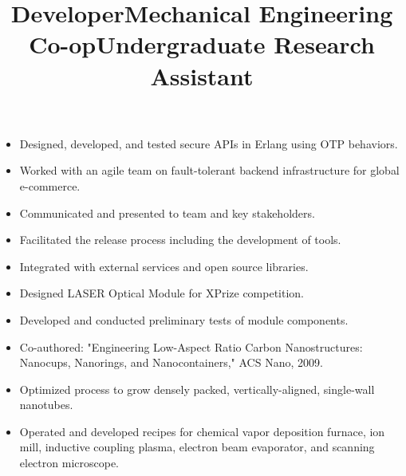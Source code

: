 \documentclass[line]{res}
\begin{document}
\begin{resume}
\title{Developer}
\begin{position}
\noindent
\vspace {-10 pt}
\begin{itemize}
\item Designed, developed, and tested secure APIs in Erlang using OTP behaviors.
\item Worked with an agile team on fault-tolerant backend infrastructure for global e-commerce.
\item Communicated and presented to team and key stakeholders.
\item Facilitated the release process including the development of tools.
\item Integrated with external services and open source libraries.
\end{itemize}
\end{position}

\title{Mechanical Engineering Co-op}
\begin{position}
\noindent
\vspace {-10 pt}
\begin{itemize}
\item Designed LASER Optical Module for XPrize competition.
\item Developed and conducted preliminary tests of module components.
\end{itemize}
\end{position}

\title{Undergraduate Research Assistant}
\begin {position}
\vspace {-10 pt}
\begin{itemize}
\item Co-authored: "Engineering Low-Aspect Ratio Carbon Nanostructures: Nanocups, Nanorings, and Nanocontainers," ACS Nano, 2009.
\item Optimized process to grow densely packed, vertically-aligned, single-wall nanotubes.
\item Operated and developed recipes for chemical vapor deposition furnace, ion mill, inductive coupling plasma, electron beam evaporator, and scanning electron microscope.
\end{itemize}
\end{position}


\end{resume}
\end{document}
